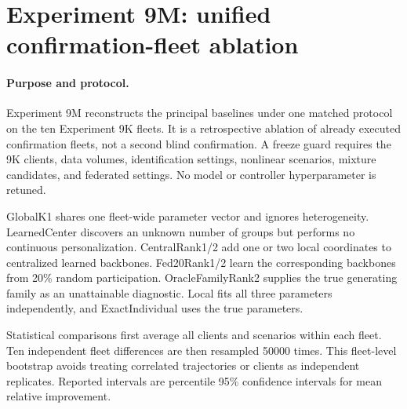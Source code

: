 \section{Experiment 9M: unified confirmation-fleet ablation}
\label{sec:experiment9m}

\paragraph{Purpose and protocol.}
Experiment 9M reconstructs the principal baselines under one matched protocol
on the ten Experiment 9K fleets. It is a retrospective ablation of already
executed confirmation fleets, not a second blind confirmation. A freeze guard
requires the 9K clients, data volumes, identification settings, nonlinear
scenarios, mixture candidates, and federated settings. No model or controller
hyperparameter is retuned.

GlobalK1 shares one fleet-wide parameter vector and ignores heterogeneity.
LearnedCenter discovers an unknown number of groups but performs no continuous
personalization. CentralRank1/2 add one or two local coordinates to centralized
learned backbones. Fed20Rank1/2 learn the corresponding backbones from 20\%
random participation. OracleFamilyRank2 supplies the true generating family as
an unattainable diagnostic. Local fits all three parameters independently, and
ExactIndividual uses the true parameters.

Statistical comparisons first average all clients and scenarios within each
fleet. Ten independent fleet differences are then resampled 50000 times. This
fleet-level bootstrap avoids treating correlated trajectories or clients as
independent replicates. Reported intervals are percentile 95\% confidence
intervals for mean relative improvement.

